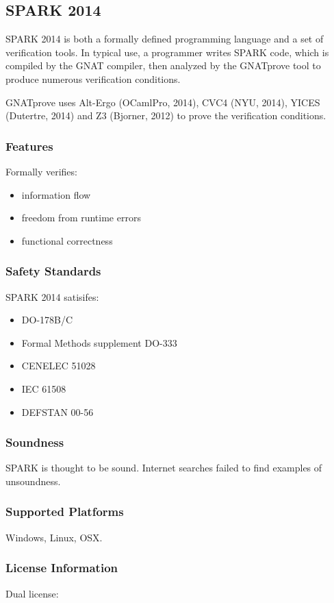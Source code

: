 \documentclass[11pt]{article}
\begin{document}
\subsection{SPARK 2014}
	SPARK 2014 is both a formally defined programming language and a set of verification tools. In typical 		use, a programmer writes SPARK code, which is compiled by the GNAT compiler, then analyzed by the
	GNATprove tool to produce numerous verification conditions.
	
	GNATprove uses Alt-Ergo (OCamlPro, 2014), CVC4 (NYU, 2014), YICES (Dutertre, 2014) and Z3 (Bjorner, 2012) 		to prove the verification conditions.

	\subsubsection{Features}
	Formally verifies:
	\begin{itemize}
		\item information flow
		\item freedom from runtime errors	
		\item functional correctness
	\end{itemize}

	\subsubsection{Safety Standards}
		SPARK 2014 satisifes:
	\begin{itemize}
		\item DO-178B/C
		\item Formal Methods supplement DO-333
		\item CENELEC 51028
		\item IEC 61508
		\item DEFSTAN 00-56
	\end{itemize}

	\subsubsection{Soundness}
		SPARK is thought to be sound. Internet searches failed to find examples of unsoundness.

	\subsubsection{Supported Platforms}
		Windows, Linux, OSX.

	\subsubsection{License Information}
		Dual license:
\end{document}
